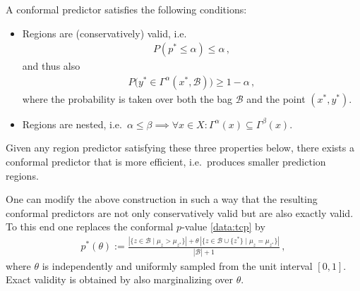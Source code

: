     \begin{property}[Optimality]
        A conformal predictor satisfies the following conditions:
        \begin{itemize}
            \item Regions are (conservatively) valid, i.e.
                \begin{gather}
                    P(p^*\leq\alpha)\leq\alpha\,,
                \end{gather}
                and thus also
                \begin{gather}
                    P\big(y^*\in\Gamma^\alpha(x^*,\mathcal{B})\big)\geq1-\alpha\,,
                \end{gather}
                where the probability is taken over both the bag $\mathcal{B}$ and the point $(x^*,y^*)$.
            \item Regions are nested, i.e.~$\alpha\leq\beta\implies\forall x\in X:\Gamma^\alpha(x)\subseteq\Gamma^\beta(x)$.
        \end{itemize}
        Given any region predictor satisfying these three properties below, there exists a conformal predictor that is more efficient, i.e.~produces smaller prediction regions.
    \end{property}

    \begin{property}\label{data:smooth_cp}
        One can modify the above construction in such a way that the resulting conformal predictors are not only conservatively valid but are also exactly valid. To this end one replaces the conformal $p$-value \eqref{data:tcp} by
        \begin{gather}
            p^*(\theta) := \frac{|\{z\in\mathcal{B}\mid\mu_z>\mu_{z^*}\}| + \theta\,|\{z\in\mathcal{B}\cup\{z^*\}\mid\mu_z=\mu_{z^*}\}|}{|\mathcal{B}|+1}\,,
        \end{gather}
        where $\theta$ is independently and uniformly sampled from the unit interval $[0,1]$. Exact validity is obtained by also marginalizing over $\theta$.
    \end{property}

